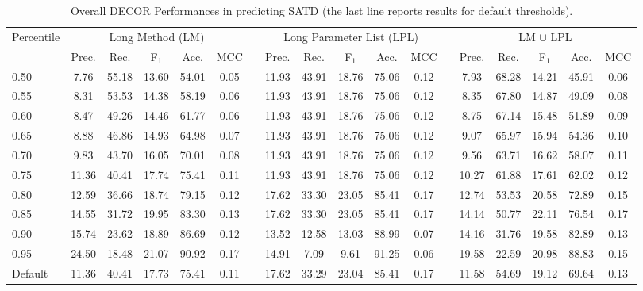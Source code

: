 \begin{landscape}
\begin{table*}[t]
	\caption{Overall DECOR Performances in predicting SATD (the last line reports results for default thresholds).}
	\label{tab:decor}
	\centering
		\begin{adjustbox}{center}
			\begin{tabular}{lccccclccccclccccc}
				\multirow{2}{*}{Percentile} & \multicolumn{5}{c}{Long Method (LM)} & & \multicolumn{5}{c}{Long Parameter List (LPL)} & & \multicolumn{5}{c}{LM $\cup$ LPL}\\
				\cline{2-18}
				& Prec. & Rec. & F$_1$ & Acc. & MCC &  & Prec. & Rec. & F$_1$ & Acc. & MCC &  & Prec. & Rec. & F$_1$ & Acc. & MCC\\
				\hline
				0.50 & 7.76 & 55.18 & 13.60 & 54.01 & 0.05 &  & 11.93 & 43.91 & 18.76 & 75.06 & 0.12 &  & 7.93 & 68.28 & 14.21 & 45.91 & 0.06\\
				0.55 & 8.31 & 53.53 & 14.38 & 58.19 & 0.06 &  & 11.93 & 43.91 & 18.76 & 75.06 & 0.12 &  & 8.35 & 67.80 & 14.87 & 49.09 & 0.08\\
				0.60 & 8.47 & 49.26 & 14.46 & 61.77 & 0.06 &  & 11.93 & 43.91 & 18.76 & 75.06 & 0.12 &  & 8.75 & 67.14 & 15.48 & 51.89 & 0.09\\
				0.65 & 8.88 & 46.86 & 14.93 & 64.98 & 0.07 &  & 11.93 & 43.91 & 18.76 & 75.06 & 0.12 &  & 9.07 & 65.97 & 15.94 & 54.36 & 0.10\\
				0.70 & 9.83 & 43.70 & 16.05 & 70.01 & 0.08 &  & 11.93 & 43.91 & 18.76 & 75.06 & 0.12 &  & 9.56 & 63.71 & 16.62 & 58.07 & 0.11\\
				0.75 & 11.36 & 40.41 & 17.74 & 75.41 & 0.11 &  & 11.93 & 43.91 & 18.76 & 75.06 & 0.12 &  & 10.27 & 61.88 & 17.61 & 62.02 & 0.12\\
				0.80 & 12.59 & 36.66 & 18.74 & 79.15 & 0.12 &  & 17.62 & 33.30 & 23.05 & 85.41 & 0.17 &  & 12.74 & 53.53 & 20.58 & 72.89 & 0.15\\
				0.85 & 14.55 & 31.72 & 19.95 & 83.30 & 0.13 &  & 17.62 & 33.30 & 23.05 & 85.41 & 0.17 &  & 14.14 & 50.77 & 22.11 & 76.54 & 0.17\\
				0.90 & 15.74 & 23.62 & 18.89 & 86.69 & 0.12 &  & 13.52 & 12.58 & 13.03 & 88.99 & 0.07 &  & 14.16 & 31.76 & 19.58 & 82.89 & 0.13\\
				0.95 & 24.50 & 18.48 & 21.07 & 90.92 & 0.17 &  & 14.91 & 7.09 & 9.61 & 91.25 & 0.06 &  & 19.58 & 22.59 & 20.98 & 88.83 & 0.15\\
				\hline
				Default & 11.36 & 40.41 & 17.73 & 75.41 & 0.11 & &  17.62 & 33.29 & 23.04 & 85.41 & 0.17 & & 11.58 & 54.69 & 19.12 & 69.64 & 0.13\\
				\hline
			\end{tabular}
		\end{adjustbox}
	\vspace{-3mm}
\end{table*}
\end{landscape}

